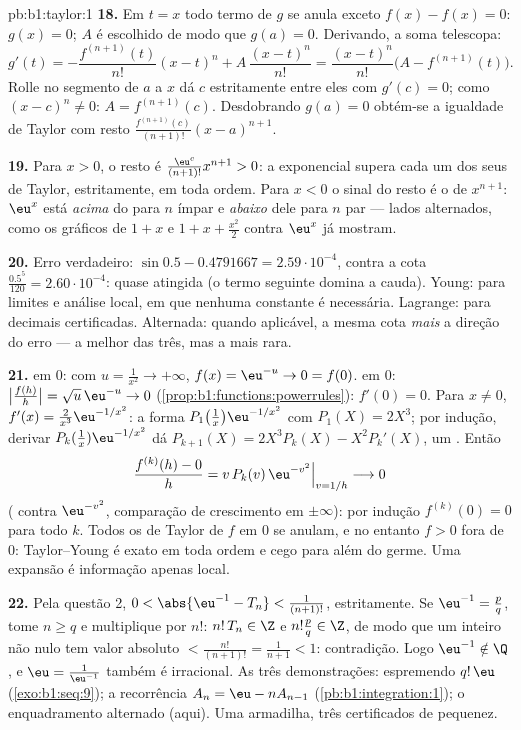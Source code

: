 \begin{solution}{pb:b1:taylor:1}
\textbf{18.} Em $t = x$ todo termo de $g$ se anula exceto $f(x)
- f(x) = 0$:
$g(x) = 0$; $A$ é escolhido de modo que $g(a) = 0$.
Derivando, a soma telescopa:
\[
g'(t) = -\frac{f^{(n+1)}(t)}{n!}(x - t)^n +
A\,\frac{(x-t)^n}{n!}
= \frac{(x-t)^n}{n!}\bigl(A - f^{(n+1)}(t)\bigr) .
\]
Rolle no segmento de $a$ a $x$ dá $c$ estritamente entre eles
com $g'(c) = 0$; como $(x - c)^n \neq 0$: $A =
f^{(n+1)}(c)$. Desdobrando $g(a) = 0$ obtém-se a igualdade
de Taylor com resto $\frac{f^{(n+1)}(c)}{(n+1)!}(x-a)^{n+1}$.

\textbf{19.} Para $x > 0$, o resto é $\frac{\eu^{c}}
{(n+1)!}x^{n+1} > 0$: a exponencial supera cada
um dos seus  de Taylor, estritamente, em toda ordem. Para
$x < 0$ o sinal do resto é o de $x^{n+1}$: $\eu^x$ está
\emph{acima} do  para $n$ ímpar e \emph{abaixo} dele para
$n$ par --- lados alternados, como os gráficos de $1 + x$ e $1
+ x + \frac{x^2}{2}$
contra $\eu^x$ já mostram.

\textbf{20.} Erro verdadeiro: $\sin 0.5 - 0.4791667 =
2.59\cdot10^{-4}$, contra a cota $\frac{0.5^5}{120} =
2.60\cdot10^{-4}$: quase
atingida (o termo seguinte domina a cauda). Young: para limites e
análise local, em que nenhuma constante é necessária. Lagrange:
para decimais certificadas. Alternada: quando aplicável, a mesma
cota \emph{mais} a direção do erro --- a melhor das três, mas a
mais rara.

\textbf{21.}  em $0$: com $u = \frac{1}{x^2} \to
+\infty$, $f(x) = \eu^{-u} \to 0 = f(0)$.  em $0$:
$\bigl|\frac{f(h)}{h}\bigr| = \sqrt u\,\eu^{-u} \to 0$
(\cref{prop:b1:functions:powerrules}): $f'(0) = 0$. Para $x \neq
0$, $f'(x) = \frac{2}{x^3}\eu^{-1/x^2}$: a forma
$P_1\bigl(\frac1x\bigr)\eu^{-1/x^2}$ com $P_1(X) = 2X^3$;
por indução, derivar $P_k(\frac1x)\eu^{-1/x^2}$ dá
$P_{k+1}(X) = 2X^3 P_k(X) - X^2 P_k'(X)$, um . Então
\[
\frac{f^{(k)}(h) - 0}{h} = v\,P_k(v)\,\eu^{-v^2}
\Big|_{v = 1/h} \longrightarrow 0
\]
( contra $\eu^{-v^2}$, comparação de crescimento em
$\pm\infty$): por indução $f^{(k)}(0) = 0$ para todo $k$. Todos os
 de Taylor de $f$ em $0$ se anulam, e no entanto $f > 0$
fora de $0$: Taylor--Young é exato em toda ordem e cego para além do
germe. Uma expansão é informação apenas local.

\textbf{22.} Pela questão 2, $0 < \abs{\eu^{-1} - T_n} <
\frac{1}{(n+1)!}$, estritamente. Se $\eu^{-1} = \frac pq$, tome $n
\geq q$
e multiplique por $n!$: $n!\,T_n \in \Z$ e $n!\frac pq
\in \Z$, de modo que um inteiro não
nulo tem valor absoluto $<
\frac{n!}{(n+1)!} = \frac{1}{n+1} < 1$: contradição. Logo
$\eu^{-1} \notin \Q$, e $\eu = \frac{1}{\eu^{-1}}$ também é
irracional. As três demonstrações:  espremendo
$q!\,\eu$ (\cref{exo:b1:seq:9}); a recorrência  $A_n =
\eu - nA_{n-1}$ (\cref{pb:b1:integration:1}); o
enquadramento alternado (aqui). Uma armadilha, três certificados de
pequenez.


\end{solution}
